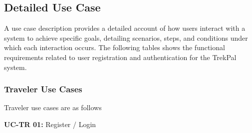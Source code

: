 \documentclass[12pt,a4paper]{article}
\newlength{\ThesisParagraphIndent}
\newcommand{\ThesisParagraph}[1]{%
  \par\begingroup
  \setlength{\leftskip}{\ThesisParagraphIndent}%
  \setlength{\parindent}{0pt}%
  \noindent#1\par
  \endgroup}
\begin{document}
\subsection{Detailed Use Case}

\ThesisParagraph{A use case description provides a detailed account of how users interact with a system to achieve specific goals, detailing scenarios, steps, and conditions under which each interaction occurs. The following tables shows the functional requirements related to user registration and authentication for the TrekPal system.}


\subsubsection{Traveler Use Cases}

\ThesisParagraph{Traveler use cases are as follows}


\ThesisParagraph{\textbf{UC-TR 01: }Register / Login}
\end{document}
